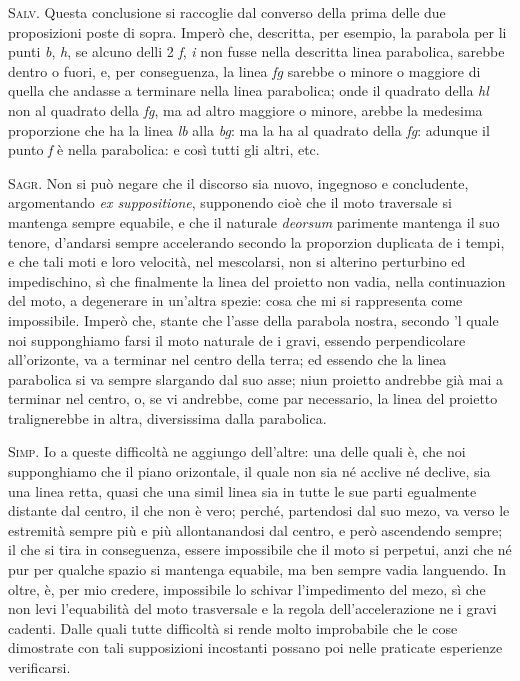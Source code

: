 \documentclass[11pt,twoside,openany]{book}
\newcommand{\speaker}[1]{\textcolor{rubric}{\textsc{#1}}\space}
\begin{document}
\speaker{Salv.} Questa conclusione si raccoglie dal converso della prima delle due proposizioni poste di sopra. Imperò che, descritta, per esempio, la parabola per li punti \emph{b}, \emph{h}, se alcuno delli 2 \emph{f}, \emph{i} non fusse nella descritta linea parabolica, sarebbe dentro o fuori, e, per conseguenza, la linea \emph{fg} sarebbe o minore o maggiore di quella che andasse a terminare nella linea parabolica; onde il quadrato della \emph{hl} non al quadrato della \emph{fg}, ma ad altro maggiore o minore, arebbe la medesima proporzione che ha la linea \emph{lb} alla \emph{bg}: ma la ha al quadrato della \emph{fg}: adunque il punto \emph{f} è nella parabolica: e così tutti gli altri, etc.

\speaker{Sagr.} Non si può negare che il discorso sia nuovo, ingegnoso e concludente, argomentando \emph{ex suppositione}, supponendo cioè che il moto traversale si mantenga sempre equabile, e che il naturale \emph{deorsum} parimente mantenga il suo tenore, d'andarsi sempre accelerando secondo la proporzion duplicata de i tempi, e che tali moti e loro velocità, nel mescolarsi, non si alterino perturbino ed impedischino, sì che finalmente la linea del proietto non vadia, nella continuazion del moto, a degenerare in un'altra spezie: cosa che mi si rappresenta come impossibile. Imperò che, stante che l'asse della parabola nostra, secondo 'l quale noi supponghiamo farsi il moto naturale de i gravi, essendo perpendicolare all'orizonte, va a terminar nel centro della terra; ed essendo che la linea parabolica si va sempre slargando dal suo asse; niun proietto andrebbe già mai a terminar nel centro, o, se vi andrebbe, come par necessario, la linea del proietto tralignerebbe in altra, diversissima dalla parabolica.

\speaker{Simp.} Io a queste difficoltà ne aggiungo dell'altre: una delle quali è, che noi supponghiamo che il piano orizontale, il quale non sia né acclive né declive, sia una linea retta, quasi che una simil linea sia in tutte le sue parti egualmente distante dal centro, il che non è vero; perché, partendosi dal suo mezo, va verso le estremità sempre più e più allontanandosi dal centro, e però ascendendo sempre; il che si tira in conseguenza, essere impossibile che il moto si perpetui, anzi che né pur per qualche spazio si mantenga equabile, ma ben sempre vadia languendo. In oltre, è, per mio credere, impossibile lo schivar l'impedimento del mezo, sì che non levi l'equabilità del moto trasversale e la regola dell'accelerazione ne i gravi cadenti. Dalle quali tutte difficoltà si rende molto improbabile che le cose dimostrate con tali supposizioni incostanti possano poi nelle praticate esperienze verificarsi.
\end{document}
